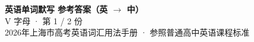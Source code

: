 \documentclass[10pt,a4paper]{article}
\begin{document}
\pagestyle{plain}

\begin{center}
{\LARGE\bfseries 英语单词默写 \quad 参考答案（英 $\to$ 中）}\\[0.22em]
{\large V 字母 · 第 1 / 2 份}\\[0.18em]
{\small 2026年上海市高考英语词汇用法手册 · 参照普通高中英语课程标准}
\end{center}

\vspace{0.2em}
\noindent{\color{rulegray}\rule{\textwidth}{0.8pt}}

\vspace{0.35em}

\vspace{0.25em}
\renewcommand{\arraystretch}{1.32}
\end{document}
